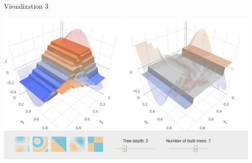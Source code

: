 
\begin{vbframe}{Visualization 3}

\begin{center}
\includegraphics[width=\textwidth]{figure_man/gbm_anim/gbm7.jpg}
\href{http://arogozhnikov.github.io/2016/06/24/gradient_boosting_explained.html}{}
\end{center}
\addtocounter{framenumber}{-1}

\end{vbframe}




